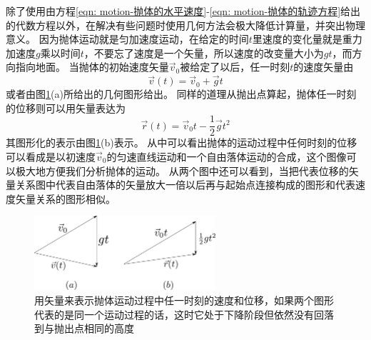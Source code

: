 除了使用由方程\ref{eqn: motion-抛体的水平速度}-\ref{eqn: motion-抛体的轨迹方程}给出的代数方程以外，在解决有些问题时使用几何方法会极大降低计算量，并突出物理意义。
因为抛体运动就是匀加速度运动，在给定的时间$t$里速度的变化量就是重力加速度$g$乘以时间$t$，不要忘了速度是一个矢量，所以速度的改变量大小为$gt$，而方向指向地面。
当抛体的初始速度矢量$\vec{v}_0$被给定了以后，任一时刻$t$的速度矢量由
\begin{equation}
\vec{v}(t)=\vec{v}_0+\vec{g}t
\end{equation}
或者由图\ref{fig: motion-矢量抛体运动描写}(a)所给出的几何图形给出。
同样的道理从抛出点算起，抛体任一时刻的位移则可以用矢量表达为
\begin{equation}
\vec{r}(t)=\vec{v}_0t-\frac{1}{2}\vec{g}t^2
\end{equation}
其图形化的表示由图\ref{fig: motion-矢量抛体运动描写}(b)表示。
从中可以看出抛体的运动过程中任何时刻的位移可以看成是以初速度$\vec{v}_0$的匀速直线运动和一个自由落体运动的合成，这个图像可以极大地方便我们分析抛体的运动。
从两个图中还可以看到，当把代表位移的矢量关系图中代表自由落体的矢量放大一倍以后再与起始点连接构成的图形和代表速度矢量关系的图形相似。
\begin{figure}[hbtp]
\centering
\includegraphics[width = 0.6\textwidth]{images/motion-10.pdf}
\caption{用矢量来表示抛体运动过程中任一时刻的速度和位移，如果两个图形代表的是同一个运动过程的话，这时它处于下降阶段但依然没有回落到与抛出点相同的高度}\label{fig: motion-矢量抛体运动描写}
\end{figure}


